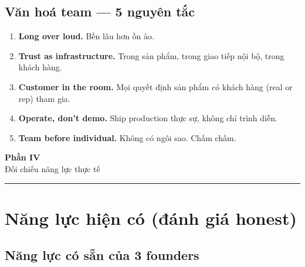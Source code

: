 \documentclass[11pt,a4paper]{article}
\begin{document}
\subsection{Văn hoá team --- 5 nguyên tắc}

\begin{enumerate}
\item \textbf{Long over loud.} Bền lâu hơn ồn ào.
\item \textbf{Trust as infrastructure.} Trong sản phẩm, trong giao tiếp nội bộ, trong khách hàng.
\item \textbf{Customer in the room.} Mọi quyết định sản phẩm có khách hàng (real or rep) tham gia.
\item \textbf{Operate, don't demo.} Ship production thực sự, không chỉ trình diễn.
\item \textbf{Team before individual.} Không có ngôi sao. Chấm chấm.
\end{enumerate}

\clearpage

\begin{center}
\vspace*{0.5em}
{\sffamily\bfseries\Huge\color{capacity} Phần IV}\\[0.5em]
{\sffamily\LARGE\color{mid} Đối chiếu năng lực thực tế}\\[0.5em]
{\color{capacity}\rule{6cm}{0.4pt}}
\end{center}
\vspace{1em}

\section{Năng lực hiện có (đánh giá honest)}

\subsection{Năng lực có sẵn của 3 founders}
\end{document}
